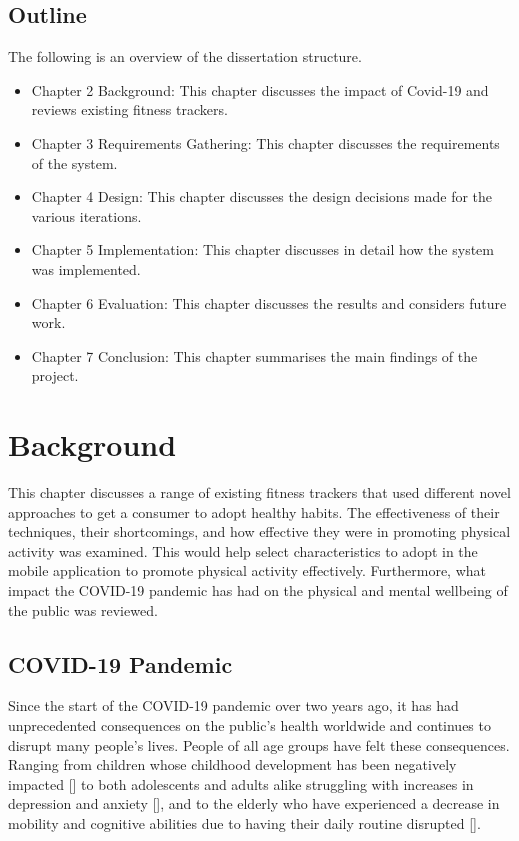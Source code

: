 \documentclass{l4proj}
\begin{document}
\section{Outline}
The following is an overview of the dissertation structure. 
\begin{itemize}
\item Chapter 2 Background: This chapter discusses the impact of Covid-19 and reviews existing fitness trackers.  
\item Chapter 3 Requirements Gathering: This chapter discusses the requirements of the system. 
\item Chapter 4 Design: This chapter discusses the design decisions made for the various iterations.
\item Chapter 5 Implementation: This chapter discusses in detail how the system was implemented.
\item Chapter 6 Evaluation: This chapter discusses the results and considers future work.
\item Chapter 7 Conclusion: This chapter summarises the main findings of the project. 
\end{itemize}

\chapter{Background}
This chapter discusses a range of existing fitness trackers that used different novel approaches to get a consumer to adopt healthy habits. The effectiveness of their techniques, their shortcomings, and how effective they were in promoting physical activity was examined. This would help select characteristics to adopt in the mobile application to promote physical activity effectively. Furthermore, what impact the COVID-19 pandemic has had on the physical and mental wellbeing of the public was reviewed. 

\section{COVID-19 Pandemic  }
Since the start of the COVID-19 pandemic over two years ago, it has had unprecedented consequences on the public's health worldwide and continues to disrupt many people's lives. People of all age groups have felt these consequences. Ranging from children whose childhood development has been negatively impacted [] to both adolescents and adults alike struggling with increases in depression and anxiety [], and to the elderly who have experienced a decrease in mobility and cognitive abilities due to having their daily routine disrupted [].
\end{document}
